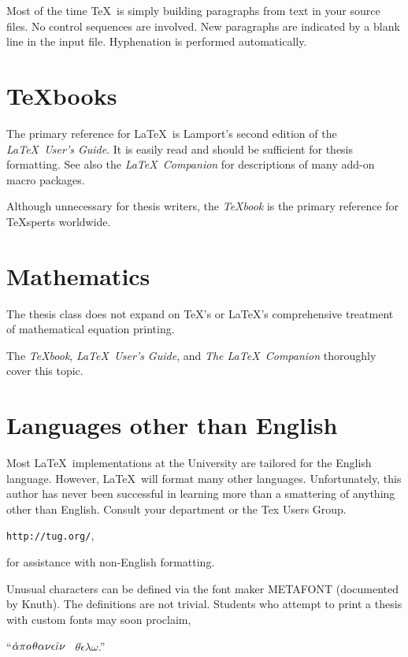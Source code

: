\documentclass [11pt, proquest] {uwthesis}[2020/02/24]
\let\mffont=\sf
\begin{document}
Most of the time \TeX\ is simply building paragraphs from
text in your source files.  No control sequences are involved.
New paragraphs are indicated by a blank line in the
input file.
Hyphenation is performed automatically.
 
\section{\TeX books}
 
The primary reference for \LaTeX\ is Lamport's second edition
of the \textit{\LaTeX\ User's Guide}\cite{Lbook}.
It is easily read and should be sufficient for thesis formatting.
See also the \textsl{\LaTeX\ Companion}\cite{companion} for descriptions
of many add-on macro packages.

Although unnecessary for thesis writers, the \textsl{\TeX book}
is the primary reference for \TeX sperts worldwide.
 
\section{Mathematics}
 
The thesis class does not expand on \TeX's
or \LaTeX's
comprehensive treatment of mathematical equation printing.%

%
The {\it\TeX book}\cite{book}, {\it \LaTeX\ User's Guide}\cite{Lbook},
and {\it The \LaTeX\ Companion}\cite{companion}
thoroughly cover this topic.
 
 
\section{Languages other than English}
 
Most \LaTeX\ implementations at the University are tailored
for the English language.  However, \LaTeX\ will format many
other languages.  Unfortunately, this author has never been successful in 
learning more than a smattering of anything other than English.
Consult your department or the Tex Users Group.
\smallskip
\begin{center}
{\tt http://tug.org/},
\end{center}
\smallskip
for assistance with non-English formatting.

Unusual characters can be defined via the
font maker \hbox{\mffont METAFONT} (documented by Knuth\cite{Metafont}).
The definitions are not trivial.
Students who attempt to print a thesis with
custom fonts may soon proclaim,
 
\medskip
\begin{center}
``$\mathaccent"7027\alpha\pi o\kern1pt\theta\alpha\nu\epsilon\hat\iota\nu$
\ $\theta\acute\epsilon\lambda\omega$.''
 
\end{center}
 
\end{document}
